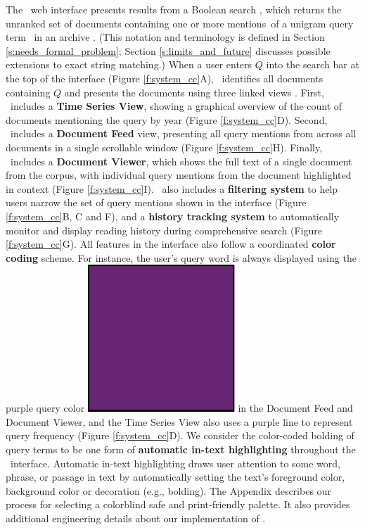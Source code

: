 The \ours~web interface presents results from a Boolean search \cite[Chapter 1]{irbook}, which returns the unranked set of documents containing one or more mentions~of a unigram query term \Q~in an archive \archive. 
(This notation and terminology is defined in Section \ref{s:needs_formal_problem}; Section \ref{s:limits_and_future} discusses possible extensions to exact string matching.)
When a user enters $Q$ into the search bar at the top of the interface (Figure \ref{f:system_cc}A), \ours~identifies all documents containing $Q$ and presents the documents using three linked views \cite{BujaLinking}. 
First, \ours~includes a \textbf{Time Series View}, showing a graphical overview of the count of documents mentioning the query by year (Figure \ref{f:system_cc}D). 
Second, \ours~includes a \textbf{Document Feed} view, presenting all query mentions from across all documents in a single scrollable window (Figure \ref{f:system_cc}H).
Finally, \ours~includes a \textbf{Document Viewer}, which shows the full text of a single document from the corpus, with individual query mentions from the document highlighted in context (Figure \ref{f:system_cc}I).
\ours~also includes a \textbf{filtering system} to help users narrow the set of query mentions shown in the interface (Figure \ref{f:system_cc}B, C and F), and a \textbf{history tracking system} to automatically monitor and display reading history during comprehensive search (Figure \ref{f:system_cc}G).
All features in the interface also follow a coordinated \textbf{color coding} scheme.
For instance, the user's query word is always displayed using the purple query color {\includegraphics[scale=0.06]{figures/CCPurple.pdf}} in the Document Feed and Document Viewer, and the Time Series View also uses a {purple} line to represent query frequency (Figure \ref{f:system_cc}D).
We consider the color-coded bolding of query terms to be one form of \textbf{automatic in-text highlighting} \cite{Handler2016VisualizingTM} throughout the \ours~interface.
Automatic in-text highlighting draws user attention to some word, phrase, or passage in text by automatically setting the text's foreground color, background color or decoration (e.g., bolding).
The Appendix describes our process for selecting a colorblind safe and print-friendly palette. 
It also provides additional engineering details about our implementation of \ours.


